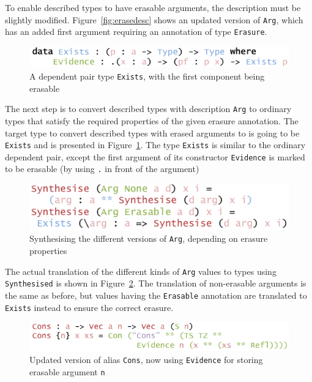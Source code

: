 \documentclass{ituthesis}
\newcommand{\ttconstructor}[1]{\textcolor{constructor-color}{\texttt{#1}}}
\newcommand{\tttype}[1]{\textcolor{type-color}{\texttt{#1}}}
\newcommand{\ttdec}[1]{\textcolor{declared-var-color}{\texttt{#1}}}
\newcommand{\ttvar}[1]{\textcolor{local-var-color}{\texttt{#1}}}
\theoremstyle{break}
\begin{document}
To enable described types to have erasable arguments, the description must be slightly modified.
Figure~\ref{fig:erasedesc} shows an updated version of \ttconstructor{Arg}, which has an added first argument requiring an annotation of type \tttype{Erasure}.

\begin{figure}[ht]
\begin{center}
    \includegraphics[scale=0.5]{Figures/ExistsType.png}
\end{center}
\caption{A dependent pair type \tttype{Exists}, with the first component being erasable}
\label{fig:existsty}
\end{figure}

The next step is to convert described types with description \ttconstructor{Arg} to ordinary types that satisfy the required properties of the given erasure annotation.
The target type to convert described types with erased arguments to is going to be \tttype{Exists} and is presented in Figure~\ref{fig:existsty}.
The type \tttype{Exists} is similar to the ordinary dependent pair, except the first argument of its constructor \ttconstructor{Evidence} is marked to be erasable (by using \texttt{.} in front of the argument)

\begin{figure}[ht]
\begin{center}
    \includegraphics[scale=0.5]{Figures/SynthesisingDataWithErasure.png}
\end{center}
\caption{Synthesising the different versions of \ttconstructor{Arg}, depending on erasure properties}
\label{fig:erasesynth}
\end{figure}

The actual translation of the different kinds of \ttconstructor{Arg} values to types using \ttdec{Synthesised} is shown in Figure~\ref{fig:erasesynth}.
The translation of non-erasable arguments is the same as before, but values having the \ttconstructor{Erasable} annotation are translated to \tttype{Exists} instead to ensure the correct erasure.

\begin{figure}[ht]
\begin{center}
    \includegraphics[scale=0.5]{Figures/VectorSynthesisedConstructorsWithErasure.png}
\end{center}
\caption{Updated version of alias \ttdec{Cons}, now using \ttconstructor{Evidence} for storing erasable argument \ttvar{n}}
\label{fig:erasecons}
\end{figure}
\end{document}

